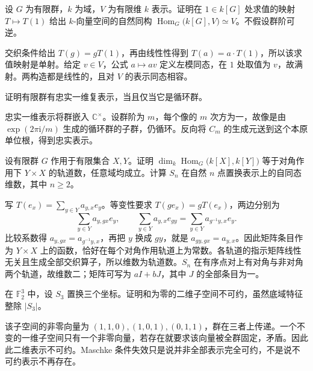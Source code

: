 \begin{exercise}\label{b5:ex:01-regular-hom}
	设 \(G\) 为有限群，\(k\) 为域，\(V\) 为有限维 \(k\) 表示。证明在 \(1\in k[G]\) 处求值的映射 \(T\mapsto T(1)\) 给出 \(k\)-向量空间的自然同构 \(\operatorname{Hom}_G\bigl(k[G],V\bigr)\simeq V\)。不假设群阶可逆。
\end{exercise}
\begin{solution}
	交织条件给出 \(T(g)=gT(1)\)，再由线性性得到 \(T(a)=a\cdot T(1)\)，所以该求值映射是单射。给定 \(v\in V\)，公式 \(a\mapsto av\) 定义左模同态，在 \(1\) 处取值为 \(v\)，故满射。两构造都是线性的，且对 \(V\) 的表示同态相容。
\end{solution}

\begin{exercise}\label{b5:ex:01-faithful-linear}
	证明有限群有忠实一维复表示，当且仅当它是循环群。
\end{exercise}
\begin{solution}
	忠实一维表示将群嵌入 \(\mathbb C^\times\)。设群阶为 \(m\)，每个像的 \(m\) 次方为一，故像是由 \(\exp(2\pi\mathrm i/m)\) 生成的循环群的子群，仍循环。反向将 \(C_m\) 的生成元送到这个本原单位根，得到忠实表示。
\end{solution}

\begin{exercise}\label{b5:ex:01-permutation-hom-orbits}
	设有限群 \(G\) 作用于有限集合 \(X,Y\)。证明 \(\dim_k\operatorname{Hom}_G\bigl(k[X],k[Y]\bigr)\) 等于对角作用下 \(Y\times X\) 的轨道数，任意域均成立。计算 \(S_n\) 在自然 \(n\) 点置换表示上的自同态维数，其中 \(n\ge2\)。
\end{exercise}
\begin{solution}
	写 \(T(e_x)=\sum_{y\in Y}a_{y,x}e_y\)。等变性要求 \(T(ge_x)=gT(e_x)\)，两边分别为
	\[
		\sum_{y\in Y}a_{y,gx}e_y,\qquad \sum_{y\in Y}a_{y,x}e_{gy} =\sum_{y\in Y}a_{g^{-1}y,x}e_y.
	\]
	比较系数得 \(a_{y,gx}=a_{g^{-1}y,x}\)，再把 \(y\) 换成 \(gy\)，就是 \(a_{gy,gx}=a_{y,x}\)。因此矩阵条目作为 \(Y\times X\) 上的函数，恰好在每个对角作用轨道上为常数。各轨道的指示矩阵线性无关且生成全部交织算子，所以维数为轨道数。\(S_n\) 在有序点对上有对角与非对角两个轨道，故维数二；矩阵可写为 \(aI+bJ\)，其中 \(J\) 的全部条目为一。
\end{solution}

\begin{exercise}\label{b5:ex:01-modular-simple}
	在 \(\mathbb F_2^3\) 中，设 \(S_3\) 置换三个坐标。证明和为零的二维子空间不可约，虽然底域特征整除 \(|S_3|\)。
\end{exercise}
\begin{solution}
	该子空间的非零向量为 \((1,1,0),(1,0,1),(0,1,1)\)，群在三者上传递。一个不变的一维子空间只有一个非零向量，若存在就要求该向量被全群固定，矛盾。因此此二维表示不可约。Maschke 条件失效只是说并非全部表示完全可约，不是说不可约表示不再存在。
\end{solution}

